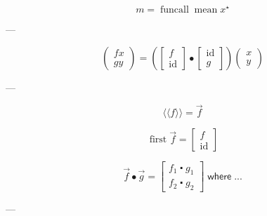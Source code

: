 \documentclass[a5paper,twoside,fleqn,draft]{jsbook}
\newcommand{\Langle}{\langle\!\langle}
\newcommand{\Rangle}{\rangle\!\rangle}
\newcommand{\mKeyword}[1]{\mathsf{#1}}
\newcommand{\mWhereKeyword}{\mKeyword{where}}
\DeclareMathOperator{\mWhere}{\mWhereKeyword}
\newcommand{\mSpecialFunc}[1]{#1}
\DeclareMathOperator{\mFirst}{\mSpecialFunc{first}}
\DeclareMathOperator{\mFuncall}{\mSpecialFunc{funcall}}
\DeclareMathOperator{\mId}{\mSpecialFunc{id}}
\DeclareMathOperator{\mMean}{\mSpecialFunc{mean}}
\DeclareMathOperator{\mComp}{\centerdot}
\DeclareMathOperator{\mCompCat}{\bullet}
\newcommand{\mArrowWith}[1]{\Langle#1\Rangle}
\newcommand{\mArrow}[1]{\Vec{#1}}
\newcommand{\mList}[1]{{#1}^\mathrm{\star}}
\begin{document}
\begin{equation}
  m=\mFuncall\mMean\mList{x}
\end{equation}


---

\begin{equation}
  \begin{pmatrix}
    fx\\
    gy
  \end{pmatrix}
  =
  \left(
  \begin{bmatrix}
    f\\
    \mId
  \end{bmatrix}
  \mCompCat
  \begin{bmatrix}
    \mId\\
    g
  \end{bmatrix}
  \right)
  \begin{pmatrix}
    x\\
    y
  \end{pmatrix}
\end{equation}

---

\begin{equation}
  \mArrowWith{f}=\mArrow{f}
\end{equation}

\begin{equation}
  \mFirst\mArrow{f}=\begin{bmatrix}f\\\mId\end{bmatrix}
\end{equation}

\begin{equation}
  \mArrow{f}\mCompCat\mArrow{g}
  =
  \begin{bmatrix}
    f_1\mComp g_1\\
    f_2\mComp g_2
  \end{bmatrix}
  \mWhere...
\end{equation}

---
\end{document}
